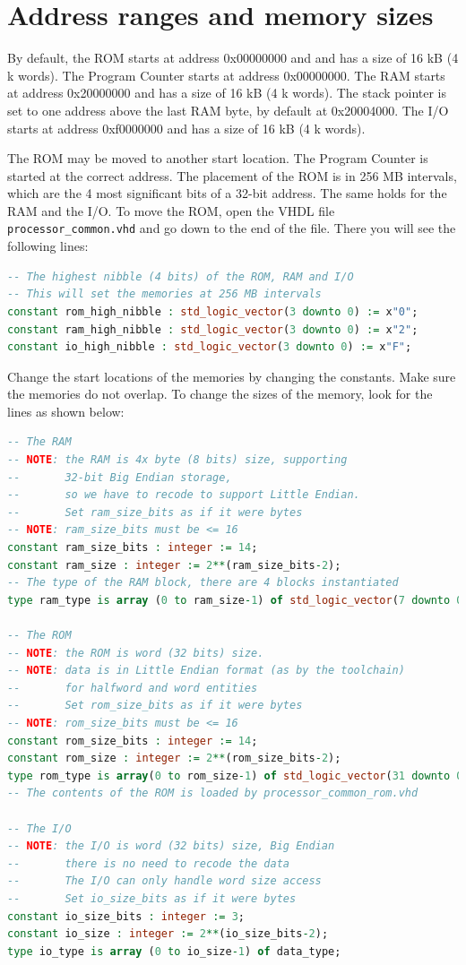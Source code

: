 \documentclass[12pt]{article}
\begin{document}
\section{Address ranges and memory sizes}
By default, the ROM starts at address 0x00000000 and and has a size of 16 kB (4 k words). The Program Counter starts at address 0x00000000. The RAM starts at address 0x20000000 and has a size of 16 kB (4 k words). The stack pointer is set to one address above the last RAM byte, by default at 0x20004000. The I/O starts at address 0xf0000000 and has a size of 16 kB (4 k words).

The ROM may be moved to another start location. The Program Counter is started at the correct address. The placement of the ROM is in 256 MB intervals, which are the 4 most significant bits of a 32-bit address. The same holds for the RAM and the I/O. To move the ROM, open the VHDL file \lstinline|processor_common.vhd| and go down to the end of the file. There you will see the following lines:

\begin{lstlisting}[language=VHDL]
-- The highest nibble (4 bits) of the ROM, RAM and I/O
-- This will set the memories at 256 MB intervals
constant rom_high_nibble : std_logic_vector(3 downto 0) := x"0";
constant ram_high_nibble : std_logic_vector(3 downto 0) := x"2";
constant io_high_nibble : std_logic_vector(3 downto 0) := x"F";
\end{lstlisting}

Change the start locations of the memories by changing the constants. Make sure the memories do not overlap. To change the sizes of the memory, look for the lines as shown below:

\begin{lstlisting}[language=VHDL]
-- The RAM
-- NOTE: the RAM is 4x byte (8 bits) size, supporting
--       32-bit Big Endian storage,
--       so we have to recode to support Little Endian.
--       Set ram_size_bits as if it were bytes
-- NOTE: ram_size_bits must be <= 16
constant ram_size_bits : integer := 14;
constant ram_size : integer := 2**(ram_size_bits-2);
-- The type of the RAM block, there are 4 blocks instantiated
type ram_type is array (0 to ram_size-1) of std_logic_vector(7 downto 0);
                    
-- The ROM
-- NOTE: the ROM is word (32 bits) size.
-- NOTE: data is in Little Endian format (as by the toolchain)
--       for halfword and word entities
--       Set rom_size_bits as if it were bytes
-- NOTE: rom_size_bits must be <= 16
constant rom_size_bits : integer := 14;
constant rom_size : integer := 2**(rom_size_bits-2);
type rom_type is array(0 to rom_size-1) of std_logic_vector(31 downto 0);
-- The contents of the ROM is loaded by processor_common_rom.vhd

-- The I/O
-- NOTE: the I/O is word (32 bits) size, Big Endian
--       there is no need to recode the data
--       The I/O can only handle word size access
--       Set io_size_bits as if it were bytes
constant io_size_bits : integer := 3;
constant io_size : integer := 2**(io_size_bits-2);
type io_type is array (0 to io_size-1) of data_type;
\end{lstlisting}
\end{document}
